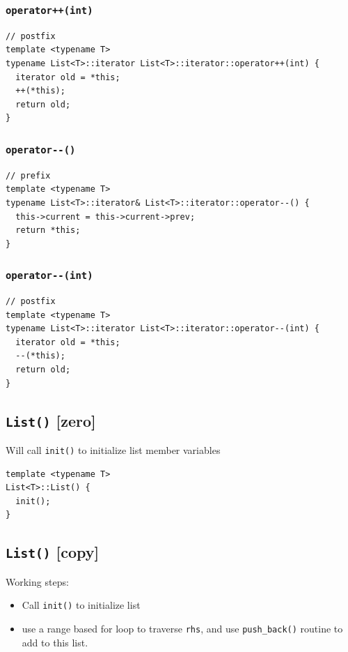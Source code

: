 \documentclass[12pt]{book}
\begin{document}
\subsubsection{\texttt{operator++(int)}}
\label{sec:orgcfe101f}
\begin{verbatim}
// postfix
template <typename T>
typename List<T>::iterator List<T>::iterator::operator++(int) {
  iterator old = *this;
  ++(*this);
  return old;
}
\end{verbatim}
\subsubsection{\texttt{operator-{}-()}}
\label{sec:org3fc7718}
\begin{verbatim}
// prefix
template <typename T>
typename List<T>::iterator& List<T>::iterator::operator--() {
  this->current = this->current->prev;
  return *this;
}
\end{verbatim}
\subsubsection{\texttt{operator-{}-(int)}}
\label{sec:org801c724}
\begin{verbatim}
// postfix
template <typename T>
typename List<T>::iterator List<T>::iterator::operator--(int) {
  iterator old = *this;
  --(*this);
  return old;
}
\end{verbatim}
\subsection{\texttt{List()}  [zero]}
\label{sec:org0f3c037}
Will call \texttt{init()} to initialize list member variables
\begin{verbatim}
template <typename T>
List<T>::List() {
  init();
}
\end{verbatim}
\subsection{\texttt{List()} [copy]}
\label{sec:org2f6ec28}
Working steps:
\begin{itemize}
\item Call \texttt{init()} to initialize list
\item use a range based for loop to traverse \texttt{rhs}, and use \texttt{push\_back()} routine to add to this list.
\end{itemize}
\end{document}
